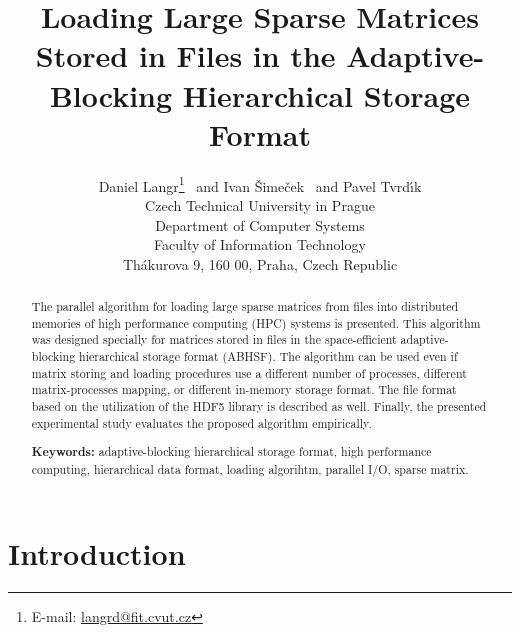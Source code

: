 \documentclass[10pt,a4paper]{article}
\begin{document}
\title{Loading Large Sparse Matrices Stored in Files in the Adaptive-Blocking Hierarchical Storage Format}
\author{Daniel Langr\footnote{E-mail: \href{mailto:langrd@fit.cvut.cz}{langrd@fit.cvut.cz}} \ and Ivan \v{S}ime\v{c}ek \ and Pavel Tvrd{\' \i}k \\
\small Czech Technical University in Prague \\
\small Department of Computer Systems \\
\small Faculty of Information Technology \\
\small Th\'{a}kurova 9, 160 00, Praha, Czech Republic \\
}


\maketitle

\begin{abstract}

The parallel algorithm for loading large sparse matrices from files into distributed memories of high performance computing (HPC) systems is presented. This algorithm was designed specially for matrices stored in files in the space-efficient adaptive-blocking hierarchical storage format (ABHSF). The algorithm can be used even if matrix storing and loading procedures use a different number of processes, different matrix-processes mapping, or different in-memory storage format. The file format based on the utilization of the HDF5 library is described as well. Finally, the presented experimental study evaluates the proposed algorithm empirically.

\textbf{Keywords:} adaptive-blocking hierarchical storage format, high performance computing, hierarchical data format, loading algorihtm, parallel I/O, sparse matrix.

\end{abstract}

\section{Introduction}
\label{sec:intro}
\end{document}
